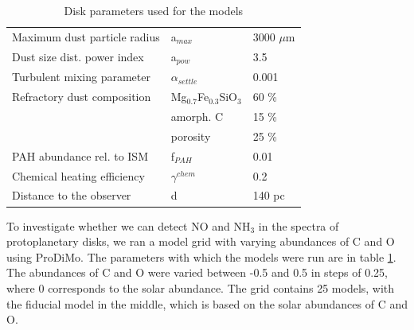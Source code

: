\documentclass[twoside, single, authoryear, semicolon]{lion-msc}
\newcommand{\4}{$_4$}
\newcommand{\3}{$_3$}
\newcommand{\2}{$_2$}
\begin{document}
\begin{table}[!ht]
\begin{tabular}{@{}lll@{}}
Maximum dust particle radius      & a$_{max}$                   & 3000 $\mu$m                \\
Dust size dist. power index       & a$_{pow}$                   & 3.5                        \\
Turbulent mixing parameter        & $\alpha_{settle}$           & 0.001                      \\
Refractory dust composition       & Mg$_{0.7}$Fe$_{0.3}$SiO\3 & 60 \%                      \\
                                  & amorph. C                   & 15 \%                      \\
                                  & porosity                    & 25 \%                      \\
PAH abundance rel. to ISM         & f$_{PAH}$                   & 0.01                       \\
Chemical heating efficiency       & $\gamma^{chem}$             & 0.2                        \\ \midrule
Distance to the observer          & d                           & 140 pc                     \\ \bottomrule
\end{tabular}
\caption{Disk parameters used for the models}
\label{tab: parameters}
\end{table}
To investigate whether we can detect NO and NH\3 in the spectra of protoplanetary disks, 
we ran a model grid with varying abundances of C and O using ProDiMo. The parameters with which the models were run are in table \ref{tab: parameters}. The abundances of C and O were varied between -0.5 and 0.5 in steps of 0.25, where 0 corresponds to the solar abundance. The grid contains 25 models, with the fiducial model in the middle, which is based on the solar abundances of C and O.
\end{document}
